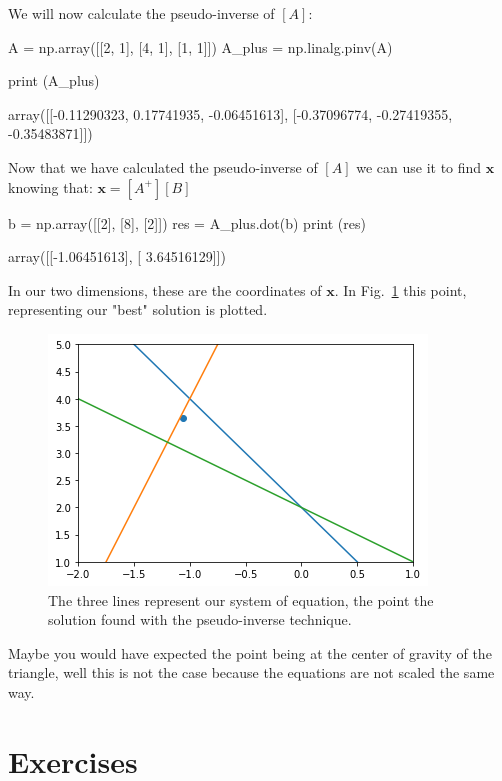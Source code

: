 We will now calculate the pseudo-inverse of $[A]$:

\begin{ipythonnon}
A = np.array([[2, 1], [4, 1], [1, 1]])
A_plus = np.linalg.pinv(A)

print (A_plus)
\end{ipythonnon}
\begin{ioutput}
array([[-0.11290323,  0.17741935, -0.06451613],
       [-0.37096774, -0.27419355, -0.35483871]])
\end{ioutput}

Now that we have calculated the pseudo-inverse of $[A]$ we can use it to find $\boldsymbol{x}$ knowing that: $\boldsymbol{x}=[A^+] [B]$

\begin{ipythonnon}
b = np.array([[2], [8], [2]])
res = A_plus.dot(b)
print (res)
\end{ipythonnon}
\begin{ioutput}
array([[-1.06451613],
       [ 3.64516129]])
\end{ioutput}

In our two dimensions, these are the coordinates of $\boldsymbol{x}$. In Fig.~\ref{fig:overdet_system} this point, representing our "best" solution is plotted.

\begin{figure}[htb]
	\centering
	\includegraphics[width=0.6\linewidth]{figures/overdet_system}
	\caption{The three lines represent our system of equation, the point 
		the solution found with the pseudo-inverse technique.}
	\label{fig:overdet_system}
\end{figure}

Maybe you would have expected the point being at the center of gravity of the triangle, well this is not the case because the equations are not scaled the same way.

\section*{Exercises}

